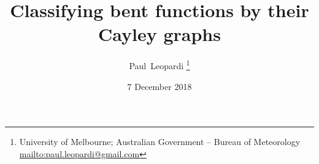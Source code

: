 \documentclass[12pt,a4paper]{article}
\title{Classifying bent functions by their Cayley graphs}
\author{
Paul~Leopardi
\thanks{University of Melbourne; Australian Government -- Bureau of Meteorology
\protect\url{mailto:paul.leopardi@gmail.com}}
}
\date{7 December 2018}
\begin{document}
\maketitle

\begin{abstract}

\end{abstract}


\end{document}
